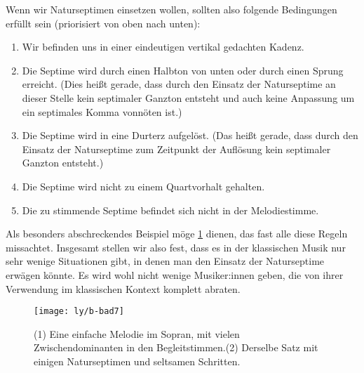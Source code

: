 Wenn wir Naturseptimen einsetzen wollen, sollten also folgende Bedingungen
erfüllt sein (priorisiert von oben nach unten):

\begin{enumerate}
\item Wir befinden uns in einer eindeutigen vertikal gedachten Kadenz.
\item Die Septime wird durch einen Halbton von unten oder durch einen Sprung
  erreicht. (Dies heißt gerade, dass durch den Einsatz der Naturseptime an
  dieser Stelle kein septimaler Ganzton entsteht und auch keine Anpassung um ein
  septimales Komma vonnöten ist.)
\item Die Septime wird in eine Durterz aufgelöst. (Das heißt gerade, dass durch
  den Einsatz der Naturseptime zum Zeitpunkt der Auflösung kein septimaler
  Ganzton entsteht.)
\item Die Septime wird nicht zu einem Quartvorhalt gehalten.
\item Die zu stimmende Septime befindet sich nicht in der Melodiestimme.
\end{enumerate}
%
Als besonders abschreckendes Beispiel möge \cref{fig:bad7} dienen, das fast alle
diese Regeln missachtet. Insgesamt stellen wir also fest, dass es in der
klassischen Musik nur sehr wenige Situationen gibt, in denen man den Einsatz der
Naturseptime erwägen könnte.  Es wird wohl nicht wenige Musiker:innen geben, die
von ihrer Verwendung im klassischen Kontext komplett abraten.

\begin{figure}
  \centering
  \texttt{[image: ly/b-bad7]}
  \caption{(1) Eine einfache Melodie im Sopran, mit vielen Zwischendominanten in
    den Begleitstimmen.\quad (2) Derselbe Satz mit einigen
    Naturseptimen und seltsamen Schritten.}\label{fig:bad7}
\end{figure}

